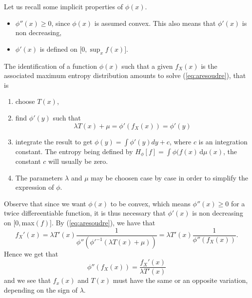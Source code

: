 \documentclass[english,onecolumn]{elsarticle}
\begin{document}
Let us recall some implicit properties of $\phi(x).$ 
\begin{itemize}
\item $\phi''(x)\geq0$, since $\phi(x)$ is assumed convex. This also means
that $\phi'(x)$ is non decreasing,
\item $\phi'(x)$ is defined on $[0,$$\sup_{x}f(x)]$. 
\end{itemize}
The identification of a function $\phi(x)$ such that a given $f_{X}(x)$
is the associated maximum entropy distribution amounts to solve (\ref{eq:aresoudre}),
that is 
\begin{enumerate}
\item choose $T(x)$,
\item find $\phi'(y)$ such that 
\begin{equation}
\lambda T(x)+\mu=\phi'\left(f_{X}(x)\right)=\phi'(y)\label{eq:inv}
\end{equation}

\item integrate the result to get $\phi(y)=\int\phi'(y)dy+c$, where $c$
is an integration constant. The entropy being defined by $H_{\phi}[f]=\int\phi(f(x)\,\text{d}\mu(x)$,
the constant $c$ will usually be zero. 
\item The parameters $\lambda$ and $\mu$ may be choosen case by case in
order to simplify the expression of $\phi.$ 
\end{enumerate}
Observe that since we want $\phi(x)$ to be convex, which means $\phi''(x)\geq0$
for a twice differeentiable function, it is thus necessary that $\phi'(x)$
is non decreasing on $[0,$max$(f)]$. By (\ref{eq:aresoudre}), we
have that 
\[
f_{X}'(x)=\lambda T'(x)\frac{1}{\phi''\left(\phi'^{-1}\left(\lambda T(x)+\mu\right)\right)}=\lambda T'(x)\frac{1}{\phi''\left(f_{X}(x)\right)}.
\]
Hence we get that 
\[
\phi''\left(f_{X}(x)\right)=\frac{f_{X}'(x)}{\lambda T'(x)}
\]
and we see that $f_{x}(x)$ and $T(x)$ must have the same or an opposite
variation, depending on the sign of $\lambda$. 
\end{document}
